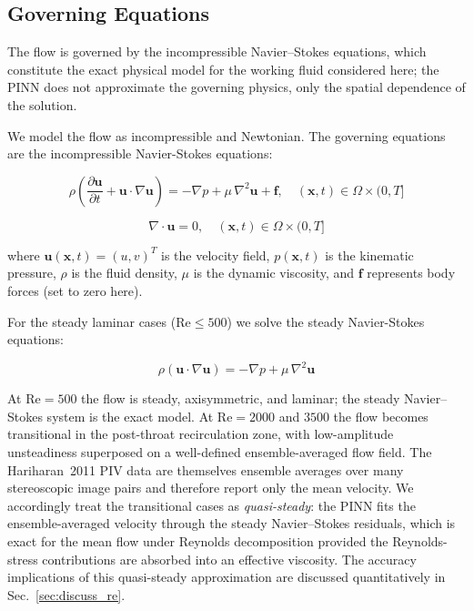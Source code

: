 \documentclass[12pt,a4paper]{article}
\newcommand{\bu}{\bm{u}}          %
\newcommand{\bx}{\bm{x}}          %
\newcommand{\nablah}{\nabla}       %
\newcommand{\Reyn}{\mathrm{Re}}    %
\begin{document}
\subsection{Governing Equations}
\label{sec:governing}

The flow is governed by the incompressible Navier--Stokes
equations, which constitute the exact physical model for the
working fluid considered here; the PINN does not approximate
the governing physics, only the spatial dependence of the
solution.

We model the flow as incompressible and Newtonian. The governing
equations are the incompressible Navier-Stokes equations:

\begin{equation}
  \rho\left(\frac{\partial \bu}{\partial t}
  + \bu \cdot \nablah\bu\right)
  = -\nablah p
  + \mu\,\nablah^2 \bu
  + \bm{f},
  \quad (\bx, t) \in \Omega \times (0, T]
  \label{eq:NS_momentum}
\end{equation}

\begin{equation}
  \nablah \cdot \bu = 0,
  \quad (\bx, t) \in \Omega \times (0, T]
  \label{eq:NS_continuity}
\end{equation}

where $\bu(\bx, t) = (u, v)^T$ is the velocity field,
$p(\bx, t)$ is the kinematic pressure, $\rho$ is the fluid
density, $\mu$ is the dynamic viscosity, and $\bm{f}$ represents
body forces (set to zero here).

For the steady laminar cases ($\Reyn \leq 500$) we solve the
steady Navier-Stokes equations:

\begin{equation}
  \rho\left(\bu \cdot \nablah\bu\right)
  = -\nablah p + \mu\,\nablah^2 \bu
  \label{eq:NS_steady}
\end{equation}

At $\Reyn = 500$ the flow is steady, axisymmetric, and laminar;
the steady Navier--Stokes system is the exact model. At
$\Reyn = 2000$ and $3500$ the flow becomes transitional in the
post-throat recirculation zone, with low-amplitude unsteadiness
superposed on a well-defined ensemble-averaged flow field. The
Hariharan~2011 PIV data are themselves ensemble averages over
many stereoscopic image pairs and therefore report only the
mean velocity. We accordingly treat the transitional cases as
\emph{quasi-steady}: the PINN fits the ensemble-averaged
velocity through the steady Navier--Stokes residuals, which is
exact for the mean flow under Reynolds decomposition provided
the Reynolds-stress contributions are absorbed into an
effective viscosity. The accuracy implications of this
quasi-steady approximation are discussed quantitatively in
Sec.~\ref{sec:discuss_re}.
\end{document}
